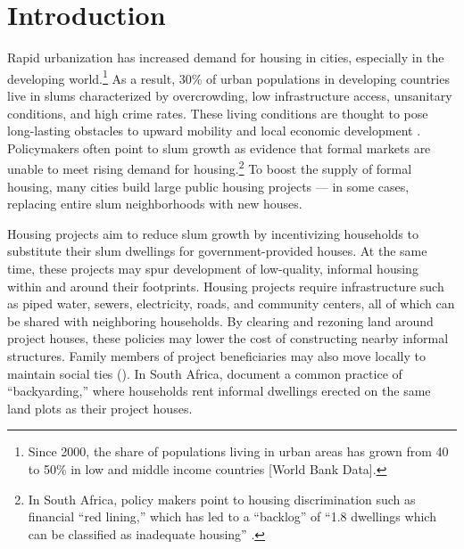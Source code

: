 \documentclass[12pt]{article}
\begin{document}
\section{Introduction} \label{sec:introduction}




Rapid urbanization has increased demand for housing in cities, especially in the developing world.\footnote{Since 2000, the share of populations living in urban areas has grown from 40 to 50\% in low and middle income countries [World Bank Data].}  As a result, 30\% of urban populations in developing countries live in slums characterized by overcrowding, low infrastructure access, unsanitary conditions, and high crime rates. These living conditions are thought to pose long-lasting obstacles to upward mobility and local economic development \citep{marx2013slums}.  Policymakers often point to slum growth as evidence that formal markets are unable to meet rising demand for housing.\footnote{In South Africa, policy makers point to housing discrimination such as financial ``red lining,'' which has led to a ``backlog'' of ``1.8 dwellings which can be classified as inadequate housing'' \citep{bng}.}  To boost the supply of formal housing, many cities build large public housing projects --- in some cases, replacing entire slum neighborhoods with new houses. %

Housing projects aim to reduce slum growth by incentivizing households to substitute their slum dwellings for government-provided houses.  At the same time, these projects may spur development of low-quality, informal housing within and around their footprints.  Housing projects require infrastructure such as piped water, sewers, electricity, roads, and community centers, all of which can be shared with neighboring households.  By clearing and rezoning land around project houses, these policies may lower the cost of constructing nearby informal structures.  Family members of project beneficiaries may also move locally to maintain social ties (\cite{franklin2016enabled}).  In South Africa, \cite{Brueckner2018backyarding} document a common practice of ``backyarding,'' where households rent informal dwellings erected on the same land plots as their project houses.  
\end{document}
